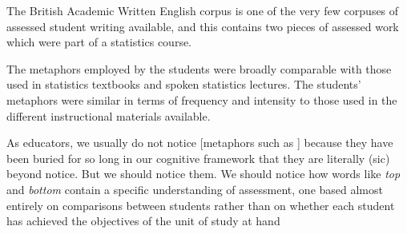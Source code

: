 The British Academic Written English corpus is one of the very few
corpuses of assessed student writing available, and this contains two
pieces of assessed work which were part of a statistics course.

The metaphors employed by the students were broadly comparable with
those used in statistics textbooks and spoken statistics lectures.
The students' metaphors were similar in terms of frequency and
intensity to those used in the different instructional materials
available.

\vfill

\begin{singlespace}
\setlength{\epigraphwidth}{.7\textwidth} %
\epigraph{As educators, we usually do not notice [metaphors such as
    ] because they have been buried for so long in
  our cognitive framework that they are literally (sic) beyond notice.
  But we should notice them.  We should notice how words like
  \emph{top} and \emph{bottom} contain a specific understanding of
  assessment, one based almost entirely on comparisons between
  students rather than on whether each student has achieved the
  objectives of the unit of study at hand}{\cite[page 6]{badley2012}}
\end{singlespace}
